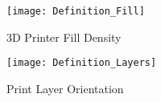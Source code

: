 	\begin{figure} [H]
		\centering
		\caption{3D Printer Fill Density }
		\texttt{[image: Definition\_Fill]}
		\label{fig:Fill_definition}
	\end{figure}
	\begin{figure} [H]
		\centering
		\caption{Print Layer Orientation}
		\texttt{[image: Definition\_Layers]}
		\label{fig:Layer_definitiion}
	\end{figure}
